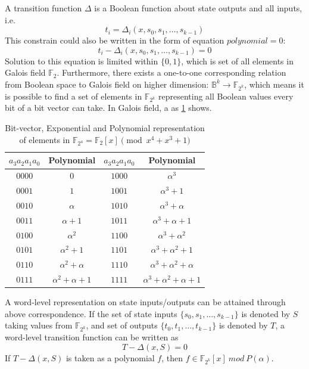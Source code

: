 A transition function $\Delta$ is a Boolean function about state outputs and all inputs, i.e.
\begin{displaymath}
t_i = \Delta_i(x, s_0, s_1, \dots, s_{k-1})
\end{displaymath}
This constrain could also be written in the form of equation $polynomial = 0$:
\begin{displaymath}
t_i - \Delta_i(x, s_0, s_1, \dots, s_{k-1}) = 0
\end{displaymath}
Solution to this equation is limited within $\{0, 1\}$, which is set of all elements in Galois field $\mathbb{F}_2$.
Furthermore, there exists a one-to-one corresponding relation from Boolean space to Galois field on higher dimension: 
$\mathbb{B}^k \to \mathbb{F}_{2^k}$, which means it is possible to find a set of elements in $\mathbb{F}_{2^k}$ representing
all Boolean values every bit of a bit vector can take. In Galois field, a as \ref{table:booltogalois} shows.
\begin{table}[h]
\centering
\begin{tabular}{|c|c||c|c|} 
\hline
$a_3a_2a_1a_0$ & Polynomial     &$a_3a_2a_1a_0$ & Polynomial  \\
\hline
$0000$        & $0$           & $1000$  &$\alpha^3$\\
\hline
$0001$        & $1$           & $1001$  & $\alpha^3 + 1$\\
\hline
$0010$        &  $\alpha$       & $1010$ & $\alpha^3 + \alpha$  \\
\hline
$0011$        &  $\alpha + 1$   & $1011$ &  $\alpha^3+\alpha+1$\\
\hline
$0100$        &  $\alpha^2$     &  $1100$ &  $\alpha^3 + \alpha^2$\\
\hline
$0101$        & $\alpha^2 + 1$ & $1101$  & $\alpha^3+\alpha^2+1$\\
\hline
$0110$        &  $\alpha^2 + \alpha$ & $1110$ &  $\alpha^3+\alpha^2+\alpha$\\
\hline
$0111$        & $\alpha^2+\alpha+1$ & $1111$ & $\alpha^3+\alpha^2+\alpha+1$\\
\hline
\end{tabular}
\caption{Bit-vector, Exponential and Polynomial representation of
elements in  ${\mathbb{F}}_{2^4} = {\mathbb{F}}_2[x]
\pmod{x^4+x^3+1}$}\label{table:booltogalois}  
\end{table}
A word-level representation on state inputs/outputs can be attained through above correspondence. If the set of 
state inputs $\{s_0, s_1, \dots, s_{k-1}\}$ is denoted by $S$ taking values from $\mathbb{F}_{2^k}$, and
set of outputs $\{t_0, t_1, \dots, t_{k-1}\}$ is denoted by $T$, a word-level transition function can be written as
\begin{displaymath}
T - \Delta(x, S) = 0
\end{displaymath}
If $T - \Delta(x, S)$ is taken as a polynomial $f$, then $f \in \mathbb{F}_{2^k}[x]\ mod\ P(\alpha)$.
